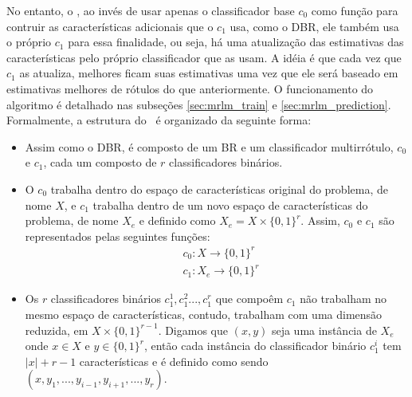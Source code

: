 No entanto, o \MRLMa, ao invés de usar apenas o classificador base $c_0$ como função para contruir
as características adicionais que o $c_1$ usa, como o DBR,
ele também usa o próprio $c_1$ para essa finalidade, ou seja, há uma atualização das estimativas das características
pelo próprio classificador que as usam.
A idéia é que cada vez que $c_1$ as atualiza, melhores ficam suas estimativas uma vez que ele será baseado
em estimativas melhores de rótulos do que anteriormente. 
O funcionamento do algoritmo é detalhado nas subseções \ref{sec:mrlm_train} e \ref{sec:mrlm_prediction}.
Formalmente, a estrutura do \MRLMa~é organizado da seguinte forma:
\begin{itemize}
  \item Assim como o DBR, é composto de um BR e um classificador multirrótulo, $c_0$ e $c_1$,
  cada um composto de $r$ classificadores binários.
  \item O $c_0$ trabalha dentro do espaço de características original do problema, de nome $X$,
  e $c_1$ trabalha dentro de um novo espaço de características do problema, de nome $X_e$ e
   definido como $X_e=X \times \{0,1\}^{r}$. Assim, $c_0$ e $c_1$ são
  representados pelas seguintes funções:
  \begin{equation}
  \begin{split}
   & c_0 : X \rightarrow \{0,1\}^r \\
   & c_1 : X_e \rightarrow \{0,1\}^r
   \end{split}
  \end{equation}
  \item Os $r$ classificadores binários $c_1^1,c_1^2...,c_1^r$ que compoêm $c_1$ não trabalham no mesmo
  espaço de características, contudo,
  trabalham com uma dimensão reduzida, em $X \times \{0,1\}^{r-1}$. Digamos que $(x,y)$ seja uma instância de $X_e$
  onde $x \in X$ e $y \in {\{0,1\}}^r$, então cada instância 
  do classificador binário $c_1^i$ tem $|x|+r-1$ características e é definido como sendo $(x,y_1,...,y_{i-1},y_{i+1},...,y_{r})$.


\end{itemize}
